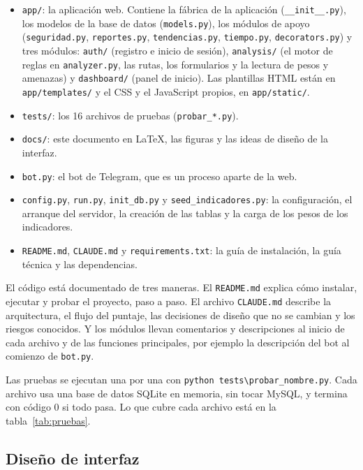 \documentclass[journal,onecolumn,12pt,draftclsnofoot]{IEEEtran}
\begin{document}
\begin{itemize}
  \item \texttt{app/}: la aplicación web. Contiene la fábrica de la aplicación (\texttt{\_\_init\_\_.py}), los modelos de la base de datos (\texttt{models.py}), los módulos de apoyo (\texttt{seguridad.py}, \texttt{reportes.py}, \texttt{tendencias.py}, \texttt{tiempo.py}, \texttt{decorators.py}) y tres módulos: \texttt{auth/} (registro e inicio de sesión), \texttt{analysis/} (el motor de reglas en \texttt{analyzer.py}, las rutas, los formularios y la lectura de pesos y amenazas) y \texttt{dashboard/} (panel de inicio). Las plantillas HTML están en \texttt{app/templates/} y el CSS y el JavaScript propios, en \texttt{app/static/}.
  \item \texttt{tests/}: los 16 archivos de pruebas (\texttt{probar\_*.py}).
  \item \texttt{docs/}: este documento en LaTeX, las figuras y las ideas de diseño de la interfaz.
  \item \texttt{bot.py}: el bot de Telegram, que es un proceso aparte de la web.
  \item \texttt{config.py}, \texttt{run.py}, \texttt{init\_db.py} y \texttt{seed\_indicadores.py}: la configuración, el arranque del servidor, la creación de las tablas y la carga de los pesos de los indicadores.
  \item \texttt{README.md}, \texttt{CLAUDE.md} y \texttt{requirements.txt}: la guía de instalación, la guía técnica y las dependencias.
\end{itemize}

El código está documentado de tres maneras. El \texttt{README.md} explica cómo instalar, ejecutar y probar el proyecto, paso a paso. El archivo \texttt{CLAUDE.md} describe la arquitectura, el flujo del puntaje, las decisiones de diseño que no se cambian y los riesgos conocidos. Y los módulos llevan comentarios y descripciones al inicio de cada archivo y de las funciones principales, por ejemplo la descripción del bot al comienzo de \texttt{bot.py}.

Las pruebas se ejecutan una por una con \texttt{python tests\textbackslash probar\_nombre.py}. Cada archivo usa una base de datos SQLite en memoria, sin tocar MySQL, y termina con código 0 si todo pasa. Lo que cubre cada archivo está en la tabla~\ref{tab:pruebas}.

\subsection{Diseño de interfaz}\label{sec:interfaz}
\end{document}
